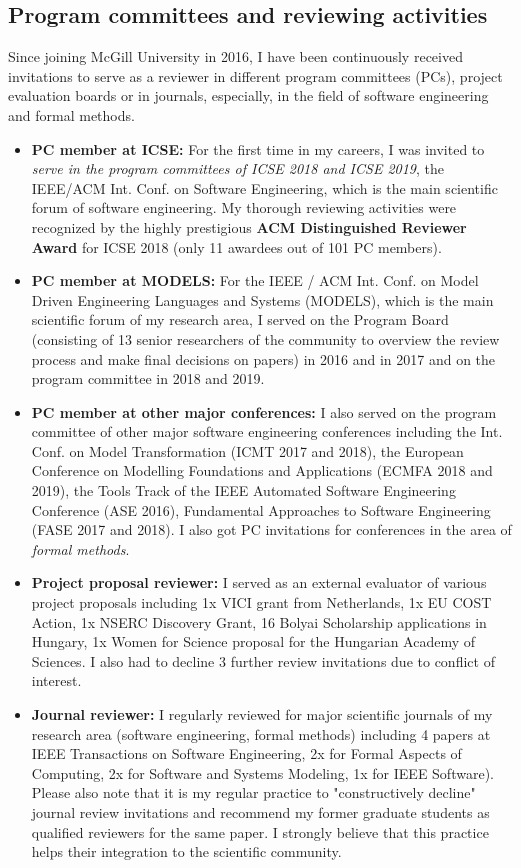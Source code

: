 \subsection{Program committees and reviewing activities}
Since joining McGill University in 2016, I have been continuously received invitations to serve as a reviewer in different program committees (PCs), project evaluation boards or in journals, especially, in the field of software engineering and formal methods. 

\begin{itemize}[leftmargin=0.5cm]
\item \textbf{PC member at ICSE:}
For the first time in my careers, I was invited to \emph{serve in the program committees of ICSE 2018 and ICSE 2019}, the IEEE/ACM Int. Conf. on Software Engineering, which is the main scientific forum of software engineering. My thorough reviewing activities were recognized by the highly prestigious \textbf{ACM Distinguished Reviewer Award} for ICSE 2018 (only 11 awardees out of 101 PC members). 

\item \textbf{PC member at MODELS:}
For the IEEE / ACM Int. Conf. on Model Driven Engineering Languages and Systems (MODELS), which is the main scientific forum of my research area, I served on the Program Board (consisting of 13 senior researchers of the community to overview the review process and make final decisions on papers) in 2016 and in 2017 and on the program committee in 2018 and 2019. 

\item \textbf{PC member at other major conferences:}
I also served on the program committee of other major software engineering conferences including the 
Int. Conf. on Model Transformation (ICMT 2017 and 2018), the European Conference on Modelling Foundations and Applications (ECMFA 2018 and 2019), the Tools Track of the IEEE Automated Software Engineering Conference (ASE 2016), Fundamental Approaches to Software Engineering (FASE 2017 and 2018). I also got PC invitations for conferences in the area of \emph{formal methods}.

\item \textbf{Project proposal reviewer:}
I served as an external evaluator of various project proposals including 1x VICI grant from Netherlands, 1x EU COST Action, 1x NSERC Discovery Grant, 16 Bolyai Scholarship applications in Hungary, 1x Women for Science proposal for the Hungarian Academy of Sciences. I also had to decline 3 further review invitations due to conflict of interest.

\item \textbf{Journal reviewer:}
I regularly reviewed for major scientific journals of my research area (software engineering, formal methods) including 4 papers at IEEE Transactions on Software Engineering, 2x for Formal Aspects of Computing, 2x for Software and Systems Modeling, 1x for IEEE Software). Please also note that it is my regular practice to "constructively decline" journal review invitations and recommend my former graduate students as qualified reviewers for the same paper. I strongly believe that this practice helps their integration to the scientific community. 
\end{itemize}

